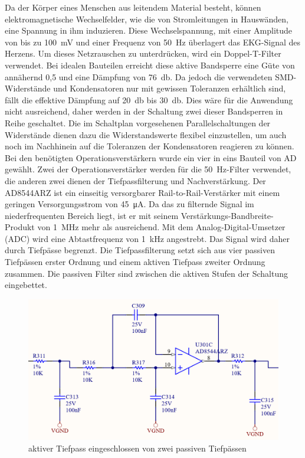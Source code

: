 Da der Körper eines Menschen aus leitendem Material besteht, können elektromagnetische Wechselfelder, wie die von Stromleitungen in Hauswänden, eine Spannung in ihm induzieren. Diese Wechselspannung, mit einer Amplitude von bis zu \SI{100}{\milli\volt} und einer Frequenz von \SI{50}{\hertz} überlagert das EKG-Signal des Herzens. Um dieses Netzrauschen zu unterdrücken, wird ein Doppel-T-Filter verwendet. Bei idealen Bauteilen erreicht diese aktive Bandsperre eine Güte von annähernd 0,5 und eine Dämpfung von \SI{76}{\decibel}. Da jedoch die verwendeten SMD-Widerstände und Kondensatoren nur mit gewissen Toleranzen erhältlich sind, fällt die effektive Dämpfung auf \SI{20}{\decibel} bis \SI{30}{\decibel}. Dies wäre für die Anwendung nicht ausreichend, daher werden in der Schaltung zwei dieser Bandsperren in Reihe geschaltet. Die im Schaltplan vorgesehenen Parallelschaltungen der Widerstände dienen dazu die Widerstandswerte flexibel einzustellen, um auch noch im Nachhinein auf die Toleranzen der Kondensatoren reagieren zu können. Bei den benötigten Operationsverstärkern wurde ein vier in eins Bauteil von AD gewählt. Zwei der Operationsverstärker werden für die \SI{50}{\hertz}-Filter verwendet, die anderen zwei dienen der Tiefpassfilterung und Nachverstärkung. Der AD8544ARZ ist ein einseitig versorgbarer Rail-to-Rail-Verstärker mit einem geringen Versorgungsstrom von \SI{45}{\micro\ampere}. Da das zu filternde Signal im niederfrequenten Bereich liegt, ist er mit seinem Verstärkungs-Bandbreite-Produkt von \SI{1}{\mega\hertz} mehr als ausreichend. Mit dem Analog-Digital-Umsetzer (ADC) wird eine Abtastfrequenz von \SI{1}{\kilo\hertz} angestrebt. Das Signal wird daher durch Tiefpässe begrenzt. Die Tiefpassfilterung setzt sich aus vier passiven Tiefpässen erster Ordnung und einem aktiven Tiefpass zweiter Ordnung zusammen. Die passiven Filter sind zwischen die aktiven Stufen der Schaltung eingebettet.

\begin{figure} [!h]
	\includegraphics[width=\textwidth] {EKG_aktiver_Tiefpassfilter.png}
	\caption{aktiver Tiefpass eingeschlossen von zwei passiven Tiefpässen}
	\label{fig3} 
\end{figure}

